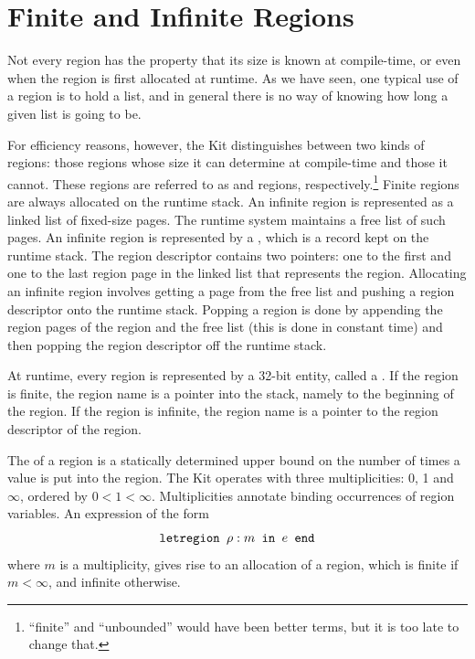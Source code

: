 \documentclass[12pt]{book}
\begin{document}
\section{Finite and Infinite Regions}
\label{fininf.sec}
Not every region has the property that its size is known at compile-time, 
or even when the region is first allocated at runtime. 
As we have seen, one typical use of a region is to hold
a list, and in general there is no way of knowing how long a given list
is going to be. 


For efficiency reasons, however, the Kit distinguishes 
between two kinds of regions: those regions whose
size it can determine at compile-time and those it cannot. 
These regions are referred to as  and 
 regions, 
respectively.\footnote{``finite'' and ``unbounded'' would have been better
terms, but it is too late to change that.}
Finite regions are always 
allocated on the runtime stack.
An infinite region is represented as a linked list of fixed-size pages.
The runtime system maintains a free list of such pages. An infinite region
is represented by a , which is a record kept on
the runtime stack. The region descriptor contains two pointers: one to
the first and one to the last region page in the linked list that
represents the region. Allocating an infinite region involves getting a
page from the free list and pushing a region descriptor 
onto the runtime
stack. Popping a region is done by appending the region pages of the
region and the free list (this is done in constant time) and then popping
the region descriptor off the runtime stack.

At runtime, every region is represented by a 32-bit entity, called
a . If the region is finite, the
region name is a pointer into the stack, namely to the beginning of the
region. If the region is infinite, the region name is a pointer to
the region descriptor of the region. 

The  of a region is a statically determined upper
bound on the number of times a value is put into the region. The Kit
operates with three multiplicities: 0, 1 and $\infty$, ordered
by $0<1<\infty$. Multiplicities annotate
binding occurrences of region variables. An expression of the form
$$\hbox{\tt letregion $\rho:m$ in $e$ end}$$
where $m$ is a multiplicity,
gives rise to an allocation of a region, which is finite if $m<\infty$, and
infinite otherwise.
\end{document}
